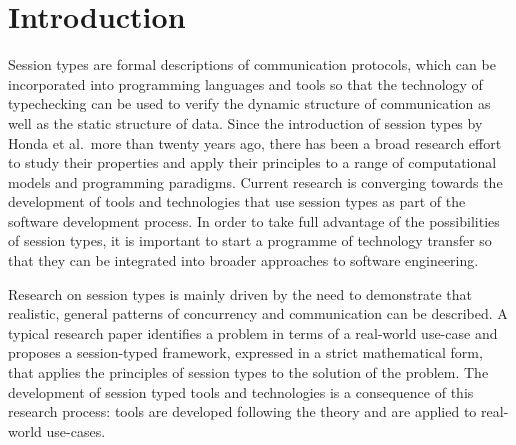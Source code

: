 
\section{Introduction}

Session types are formal descriptions of communication protocols, which can be incorporated into programming languages and tools so that the technology of typechecking can be used to verify the dynamic structure of communication as well as the static structure of data. Since the introduction of session types by Honda et al.\ more than twenty years ago, there has been a broad research effort to study their properties and apply their principles to a range of computational models and programming paradigms. Current research is converging towards the development of tools and technologies that use session types as part of the software development process. In order to take full advantage of the possibilities of session types, it is important to start a programme of technology transfer so that they can be integrated into broader approaches to software engineering.


Research on session types is mainly driven by the need to demonstrate that realistic, general patterns of concurrency and communication can be described. A typical research paper identifies a problem in terms of a real-world use-case and proposes a session-typed framework, expressed in a strict mathematical form, that applies the principles of session types to the solution of the problem. The development of session typed tools and technologies is a consequence of this research process: tools are developed following the theory and are applied to real-world use-cases.

